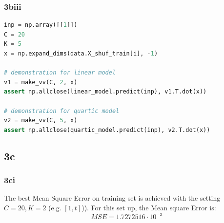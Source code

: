 \documentclass{article}
\begin{document}
\subsubsection{3biii}
\begin{lstlisting}[language=Python]
inp = np.array([[1]])
C = 20
K = 5
x = np.expand_dims(data.X_shuf_train[i], -1)

# demonstration for linear model
v1 = make_vv(C, 2, x)
assert np.allclose(linear_model.predict(inp), v1.T.dot(x))

# demonstration for quartic model
v2 = make_vv(C, 5, x)
assert np.allclose(quartic_model.predict(inp), v2.T.dot(x))
\end{lstlisting}


\subsection{3c}

\subsubsection{3ci}

The best Mean Square Error on training set is achieved with the setting $C=20, K=2$ (e.g. $[1, t]$)). For this set up, the Mean square Error is: $$MSE = 1.7272516 \cdot 10^{-3}$$
\end{document}

